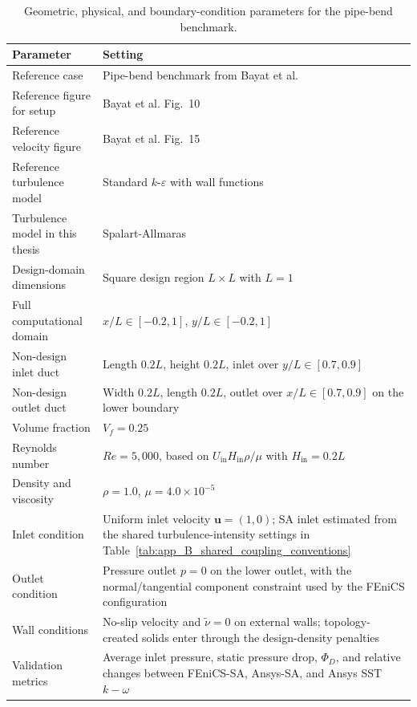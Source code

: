 \begin{table}[htbp]
	\centering
	\footnotesize
	\caption{Geometric, physical, and boundary-condition parameters for the pipe-bend benchmark.}
	\label{tab:app_B_alexandersen_pipebend_physical}
	\renewcommand{\arraystretch}{1.2}
	\begin{tabularx}{\textwidth}{l X}
		\hline
		\textbf{Parameter} & \textbf{Setting} \\
		\hline
		Reference case & Pipe-bend benchmark from Bayat et al.~\cite{Bayat2026} \\
		Reference figure for setup & Bayat et al. Fig.~10 \\
		Reference velocity figure & Bayat et al. Fig.~15 \\
		Reference turbulence model & Standard $k$-$\varepsilon$ with wall functions \\
		Turbulence model in this thesis & Spalart-Allmaras \\
		Design-domain dimensions & Square design region $L\times L$ with $L=1$ \\
		Full computational domain & $x/L\in[-0.2,1]$, $y/L\in[-0.2,1]$ \\
		Non-design inlet duct & Length $0.2L$, height $0.2L$, inlet over $y/L\in[0.7,0.9]$ \\
		Non-design outlet duct & Width $0.2L$, length $0.2L$, outlet over $x/L\in[0.7,0.9]$ on the lower boundary \\
		Volume fraction & $V_f=0.25$ \\
		Reynolds number & $Re=5{,}000$, based on $U_{\mathrm{in}}H_{\mathrm{in}}\rho/\mu$ with $H_{\mathrm{in}}=0.2L$ \\
		Density and viscosity & $\rho=1.0$, $\mu=4.0\times10^{-5}$ \\
		Inlet condition & Uniform inlet velocity $\mathbf{u}=(1,0)$; SA inlet estimated from the shared turbulence-intensity settings in Table~\ref{tab:app_B_shared_coupling_conventions} \\
		Outlet condition & Pressure outlet $p=0$ on the lower outlet, with the normal/tangential component constraint used by the FEniCS configuration \\
		Wall conditions & No-slip velocity and $\tilde{\nu}=0$ on external walls; topology-created solids enter through the design-density penalties \\
		Validation metrics & Average inlet pressure, static pressure drop, $\Phi_D$, and relative changes between FEniCS-SA, Ansys-SA, and Ansys SST $k-\omega$ \\
		\hline
	\end{tabularx}
\end{table}

